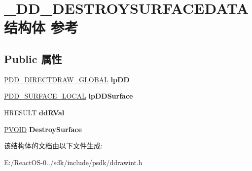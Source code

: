 \hypertarget{struct___d_d___d_e_s_t_r_o_y_s_u_r_f_a_c_e_d_a_t_a}{}\section{\+\_\+\+D\+D\+\_\+\+D\+E\+S\+T\+R\+O\+Y\+S\+U\+R\+F\+A\+C\+E\+D\+A\+T\+A结构体 参考}
\label{struct___d_d___d_e_s_t_r_o_y_s_u_r_f_a_c_e_d_a_t_a}
\subsection*{Public 属性}
\begin{DoxyCompactItemize}
\item 
\mbox{\label{struct___d_d___d_e_s_t_r_o_y_s_u_r_f_a_c_e_d_a_t_a_ad2db251e8b175cddd7d47b7e6ebd2bae}} 
\hyperlink{struct___d_d___d_i_r_e_c_t_d_r_a_w___g_l_o_b_a_l}{P\+D\+D\+\_\+\+D\+I\+R\+E\+C\+T\+D\+R\+A\+W\+\_\+\+G\+L\+O\+B\+AL} {\bfseries lp\+DD}
\item 
\mbox{\label{struct___d_d___d_e_s_t_r_o_y_s_u_r_f_a_c_e_d_a_t_a_abd26ee8f7ea3b8c7dec0ffb3053847e8}} 
\hyperlink{struct___d_d___s_u_r_f_a_c_e___l_o_c_a_l}{P\+D\+D\+\_\+\+S\+U\+R\+F\+A\+C\+E\+\_\+\+L\+O\+C\+AL} {\bfseries lp\+D\+D\+Surface}
\item 
\mbox{\label{struct___d_d___d_e_s_t_r_o_y_s_u_r_f_a_c_e_d_a_t_a_a99ff24a6611e538fece8e88a025a92a1}} 
H\+R\+E\+S\+U\+LT {\bfseries dd\+R\+Val}
\item 
\mbox{\label{struct___d_d___d_e_s_t_r_o_y_s_u_r_f_a_c_e_d_a_t_a_ab60c286b8e0c6a6e663379283bc178f4}} 
\hyperlink{interfacevoid}{P\+V\+O\+ID} {\bfseries Destroy\+Surface}
\end{DoxyCompactItemize}


该结构体的文档由以下文件生成\+:\begin{DoxyCompactItemize}
\item 
E\+:/\+React\+O\+S-\/0../sdk/include/psdk/ddrawint.\+h\end{DoxyCompactItemize}

